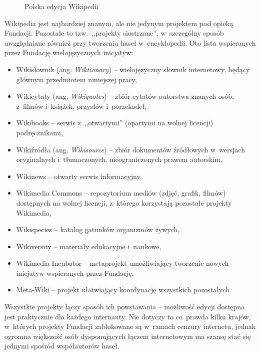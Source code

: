 \documentclass{pracamgr}
\newenvironment{illustration}[0]{
	\begin{figure}[h]
	\begin{center}
}{
	\end{center}
	\end{figure}
}
\begin{document}
\begin{illustration}
	\caption{Polska edycja Wikipedii}
\end{illustration}

Wikipedia jest najbardziej znanym, ale nie jedynym projektem pod opieką Fundacji. Pozostałe to tzw.\ ,,projekty siostrzane'', w~szczególny sposób uwzględniane również przy tworzeniu haseł w~encyklopedii. Oto lista wspieranych przez Fundację wielojęzycznych inicjatyw:
\begin{itemize}
	\item Wikisłownik (ang. \emph{Wiktionary}) -- wielojęzyczny słownik internetowy, będący głównym przedmiotem niniejszej pracy,
	\item Wikicytaty (ang. \emph{Wikiquotes}) -- zbiór cytatów autorstwa znanych osób, z~filmów i~książek, przysłów i~porzekadeł,
	\item Wikibooks -- serwis z~,,otwartymi'' (opartymi na wolnej licencji) podręcznikami,
	\item Wikiźródła (ang. \emph{Wikisource}) -- zbiór dokumentów źródłowych w~wersjach oryginalnych i~tłumaczonych, nieograniczonych prawem autorskim,
	\item Wikinews -- otwarty serwis informacyjny,
	\item Wikimedia Commons -- repozytorium mediów (zdjęć, grafik, filmów) dostępnych na wolnej licencji, z~którego korzystają pozostałe projekty Wikimedia,
	\item Wikispecies -- katalog gatunków organizmów żywych,
	\item Wikiversity -- materiały edukacyjne i~naukowe,
	\item Wikimedia Incubator -- metaprojekt umożliwiający tworzenie nowych inicjatyw wspieranych przez Fundację.
	\item Meta-Wiki -- projekt ułatwiający koordynację wszystkich pozostałych.
\end{itemize}
Wszystkie projekty łączy sposób ich powstawania -- możliwość edycji dostępna jest praktycznie dla każdego internauty. Nie dotyczy to co~prawda kilku krajów, w~których projekty Fundacji zablokowane są w~ramach cenzury internetu, jednak ogromna większość osób dysponujących łączem internetowym ma szansę stać się jednymi spośród współautorów haseł.
\end{document}
